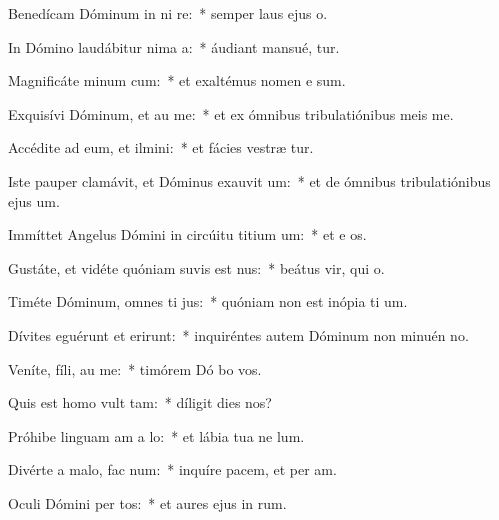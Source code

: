 \item Benedícam Dóminum in ni re:~* semper laus ejus   o.
\item In Dómino laudábitur nima a:~* áudiant mansué,  tur.
\item Magnificáte minum cum:~* et exaltémus nomen e  sum.
\item Exquisívi Dóminum, et au me:~* et ex ómnibus tribulatiónibus meis  me.
\item Accédite ad eum, et ilmini:~* et fácies vestræ  tur.
\item Iste pauper clamávit, et Dóminus exauvit um:~* et de ómnibus tribulatiónibus ejus  um.
\item Immíttet Angelus Dómini in circúitu titium um:~* et e os.
\item Gustáte, et vidéte quóniam suvis est nus:~* beátus vir, qui   o.
\item Timéte Dóminum, omnes ti jus:~* quóniam non est inópia ti um.
\item Dívites eguérunt et erirunt:~* inquiréntes autem Dóminum non minuén  no.
\item Veníte, fíli, au me:~* timórem Dó bo vos.
\item Quis est homo  vult tam:~* díligit dies  nos?
\item Próhibe linguam am a lo:~* et lábia tua ne  lum.
\item Divérte a malo,  fac num:~* inquíre pacem, et per am.
\item Oculi Dómini per tos:~* et aures ejus in  rum.
